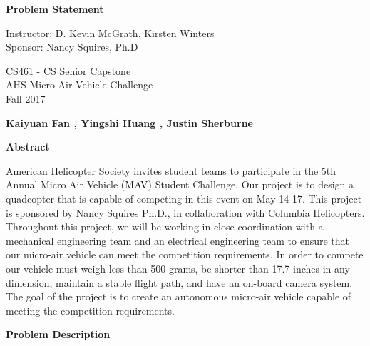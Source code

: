 \documentclass[10pt,letterpaper,onecolumn]{article}
\begin{document}
\begin{titlepage}
\begin{center}
    \huge
    \textbf{Problem Statement}

    \vspace{0.4in}
    \large
    Instructor: D. Kevin McGrath, Kirsten Winters\\
    Sponsor: Nancy Squires, Ph.D

    \vspace{0.2in}
    \large
    CS461 - CS Senior Capstone\\
    AHS Micro-Air Vehicle Challenge\\
    Fall 2017

    \vspace{0.2in}
    \textbf{Kaiyuan Fan , Yingshi Huang , Justin Sherburne }

    \vspace{0.5in}
    \textbf{Abstract}\\
    \vspace{0.2in}
    \end{center}
American Helicopter Society invites student teams to participate in the 5th Annual Micro Air Vehicle (MAV) Student Challenge. Our project is to design a quadcopter that is capable of competing in this event on May 14-17. This project is sponsored by Nancy Squires Ph.D., in collaboration with Columbia Helicopters. Throughout this project, we will be working in close coordination with a mechanical engineering team and an electrical engineering team to ensure that our micro-air vehicle can meet the competition requirements. In order to compete our vehicle must weigh less than 500 grams, be shorter than 17.7 inches in any dimension, maintain a stable flight path, and have an on-board camera system. The goal of the project is to create an autonomous micro-air vehicle capable of meeting the competition requirements.

    \vspace{0.3in}
\end{titlepage}


\newpage

\begin{center}
\large
\textbf{Problem Description}
\end{center}
\end{document}
